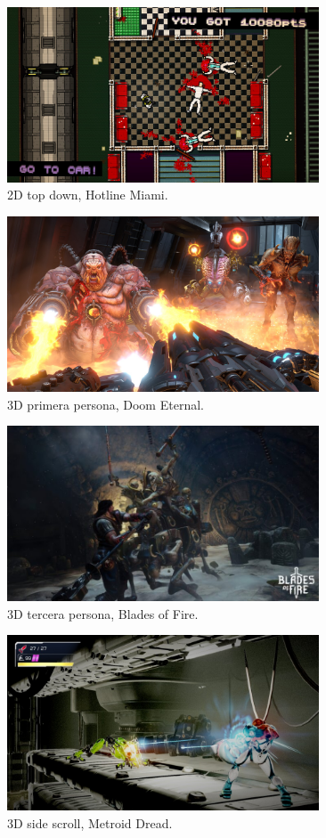 \begin{figure}[H]
  \centering
  \includegraphics[width=350px,clip=true]{hotline_miami.png}
  \caption{2D top down, Hotline Miami.}
  \label{fig:hlmiami}
\end{figure}

\begin{figure}[H]
  \centering
  \includegraphics[width=350px,clip=true]{doom_eternal.png}
  \caption{3D primera persona, Doom Eternal.}
  \label{fig:doometernal}
\end{figure}

\begin{figure}[H]
  \centering
  \includegraphics[width=350px,clip=true]{bof.png}
  \caption{3D tercera persona, Blades of Fire.}
  \label{fig:bof}
\end{figure}

\begin{figure}[H]
  \centering
  \includegraphics[width=350px,clip=true]{dread.png}
  \caption{3D side scroll, Metroid Dread.}
  \label{fig:mdread}
\end{figure}

